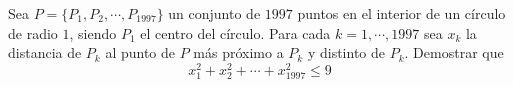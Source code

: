 Sea $P = \{ P_1, P_2, \cdots , P_{1997} \}$ un conjunto de $1997$ puntos en el interior de un círculo de radio $1$, siendo $P_1$ el centro del círculo. Para cada $k = 1, \cdots , 1997$ sea $x_k$ la distancia de $P_k$ al punto de $P$ más próximo a $P_k$ y distinto de $P_k$. Demostrar que
\[ x_1^2 + x_2^2 + \cdots + x_{1997}^2 \leq 9 \]
